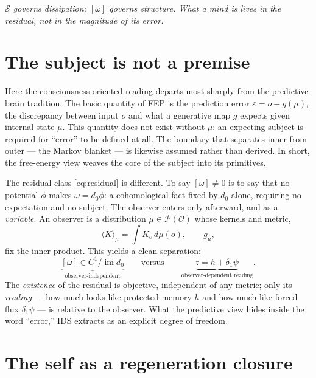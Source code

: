 \documentclass[11pt,a4paper]{article}
\newenvironment{canonbox}{\begin{mdframed}[style=canon]\itshape}{\end{mdframed}}
\theoremstyle{plain}
\begin{document}
\begin{canonbox}
$\mathcal S$ governs dissipation; $[\omega]$ governs structure. What a mind \emph{is} lives in the
residual, not in the magnitude of its error.
\end{canonbox}

\section{The subject is not a premise}\label{sec:subject}

Here the consciousness-oriented reading departs most sharply from the predictive-brain tradition. The
basic quantity of FEP is the prediction error $\varepsilon = o - g(\mu)$, the discrepancy between input
$o$ and what a generative map $g$ expects given internal state $\mu$. This quantity does not exist
without $\mu$: an expecting subject is required for ``error'' to be defined at all. The boundary that
separates inner from outer --- the Markov blanket --- is likewise assumed rather than derived. In short,
the free-energy view weaves the core of the subject into its primitives.

The residual class \eqref{eq:residual} is different. To say $[\omega]\ne0$ is to say that no potential
$\phi$ makes $\omega=d_0\phi$: a cohomological fact fixed by $d_0$ alone, requiring no expectation and
no subject. The observer enters only afterward, and as a \emph{variable}. An observer is a distribution
$\mu\in\mathcal P(\mathcal O)$ whose kernels and metric,
\begin{equation}
\langle K\rangle_\mu=\int K_o\,d\mu(o),\qquad g_\mu,
\end{equation}
fix the inner product. This yields a clean separation:
\begin{equation}
\underbrace{[\omega]\in C^1/\operatorname{im}d_0}_{\text{observer-independent}}
\qquad\text{versus}\qquad
\underbrace{\mathfrak r=h+\delta_1\psi}_{\text{observer-dependent reading}}.
\end{equation}
The \emph{existence} of the residual is objective, independent of any metric; only its \emph{reading}
--- how much looks like protected memory $h$ and how much like forced flux $\delta_1\psi$ --- is relative
to the observer. What the predictive view hides inside the word ``error,'' IDS extracts as an explicit
degree of freedom.

\section{The self as a regeneration closure}\label{sec:self}
\end{document}
